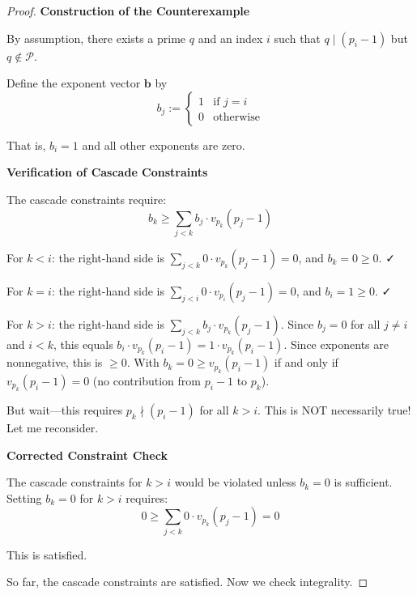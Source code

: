 \begin{proof}

\noindent \textbf{Construction of the Counterexample}

By assumption, there exists a prime $q$ and an index $i$ such that $q \mid (p_i - 1)$ but $q \notin \mathcal{P}$.

Define the exponent vector $\mathbf{b}$ by
\begin{equation}
b_j := \begin{cases} 1 & \text{if } j = i \\ 0 & \text{otherwise} \end{cases}
\end{equation}

That is, $b_i = 1$ and all other exponents are zero.

\noindent \textbf{Verification of Cascade Constraints}

The cascade constraints require:
\begin{equation}
b_k \geq \sum_{j < k} b_j \cdot v_{p_k}(p_j - 1)
\end{equation}

For $k < i$: the right-hand side is $\sum_{j < k} 0 \cdot v_{p_k}(p_j - 1) = 0$, and $b_k = 0 \geq 0$. ✓

For $k = i$: the right-hand side is $\sum_{j < i} 0 \cdot v_{p_i}(p_j - 1) = 0$, and $b_i = 1 \geq 0$. ✓

For $k > i$: the right-hand side is $\sum_{j < k} b_j \cdot v_{p_k}(p_j - 1)$. Since $b_j = 0$ for all $j \neq i$ and $i < k$, this equals $b_i \cdot v_{p_k}(p_i - 1) = 1 \cdot v_{p_k}(p_i - 1)$. Since exponents are nonnegative, this is $\geq 0$. With $b_k = 0 \geq v_{p_k}(p_i - 1)$ if and only if $v_{p_k}(p_i - 1) = 0$ (no contribution from $p_i - 1$ to $p_k$).

But wait—this requires $p_k \nmid (p_i - 1)$ for all $k > i$. This is NOT necessarily true! Let me reconsider.

\noindent \textbf{Corrected Constraint Check}

The cascade constraints for $k > i$ would be violated unless $b_k = 0$ is sufficient. Setting $b_k = 0$ for $k > i$ requires:
\begin{equation}
0 \geq \sum_{j < k} 0 \cdot v_{p_k}(p_j - 1) = 0
\end{equation}

This is satisfied.

So far, the cascade constraints are satisfied. Now we check integrality.


\end{proof}
